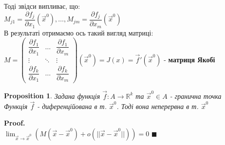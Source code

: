 \documentclass[a4paper, 14pt]{extarticle}
\def\huge{\displaystyle}
\def\bigline{\vspace{5mm}\\}
\theoremstyle{theoremdd}
\theoremstyle{theoremdd}
\theoremstyle{theoremdd}
\theoremstyle{theoremdd}
\theoremstyle{theoremdd}
\newtheorem{proposition}[theorem]{Proposition}
\theoremstyle{theoremdd}
\theoremstyle{theoremdd}
\theoremstyle{theoremdd}
\newenvironment{pf}{\vspace*{-3mm} \textbf{Proof. \\}}{$\blacksquare$}
\begin{document}
Тоді звідси випливає, що:\\
$M_{j1} = \dfrac{\partial f_j}{\partial x_1} (\vec{x}^0), \dots, M_{jm} = \dfrac{\partial f_j}{\partial x_m} (\vec{x}^0)$\\
В результаті отримаємо ось такий вигляд матриці:\\
$M = \begin{pmatrix}
\dfrac{\partial f_1}{\partial x_1} & \dots & \dfrac{\partial f_1}{\partial x_m} \\
\vdots & \ddots & \vdots \\
\dfrac{\partial f_k}{\partial x_1} & \dots & \dfrac{\partial f_k}{\partial x_m}
\end{pmatrix}(\vec{x}^0) = J(x) = \vec{f}'(\vec{x}^0)$ - \textbf{матриця Якобі}
\bigline
\begin{proposition}
Задана функція $\vec{f}: A \to \mathbb{R}^k$ та $\vec{x}^0 \in A$ - гранична точка\\
Функція $\vec{f}$ - диференційована в т. $\vec{x}^0$. Тоді вона неперервна в т. $\vec{x}^0$
\end{proposition}
\begin{pf}
$\huge \lim_{\vec{x} \to \vec{x}^0} \left(M(\vec{x}- \vec{x}^0) + o(||\vec{x} - \vec{x}^0||) \right) = 0$
\end{pf}
\\
\end{document}
